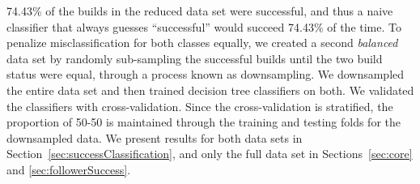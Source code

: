\documentclass[10pt, conference]{IEEEtran}
\begin{document}
74.43\% of the builds in the reduced data set were successful, and thus a naive
classifier that always guesses ``successful'' would succeed 74.43\% of the time.
To penalize misclassification for
both classes equally, we created a second \emph{balanced} data set by randomly 
sub-sampling the successful builds until the two build status were
equal, through a process known as downsampling. We downsampled the entire
data set and then trained decision tree classifiers on both.  We validated the
classifiers with cross-validation. Since the cross-validation is stratified, the
proportion of 50-50 is maintained through the training and testing folds for the
downsampled data. We present results for both
data sets in Section~\ref{sec:successClassification},  and only the full data 
set in Sections~\ref{sec:core} and \ref{sec:followerSuccess}.
\end{document}
